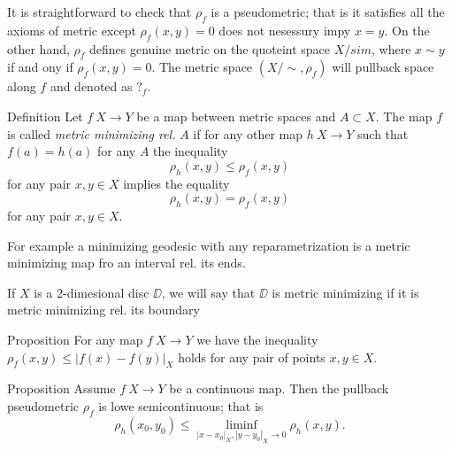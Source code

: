 It is straightforward to check that $\rho_f$ is a pseudometric;
that is it satisfies all the axioms of metric except $\rho_f(x,y)=0$ does not nesessury impy $x=y$.
On the other hand, $\rho_f$
defines genuine metric on the quoteint space $X/sim$,
where $x\sim y$ if and ony if $\rho_f(x,y)=0$.
The metric space $(X/\sim,\rho_f)$ will pullback space along $f$
and denoted as $?_f$.

\begin{thm}{Definition}
Let $f\:X\to Y$ be a map between metric spaces
and $A\subset X$.
The map $f$ is called \emph{metric minimizing rel.} $A$
if for any other map $h\: X\to Y$ 
such that $f(a)=h(a)$ for any $A$
the inequality
\[\rho_{h}(x,y)\le \rho_f(x,y)\]
for any pair $x,y\in X$
implies the equality
\[\rho_{h}(x,y)= \rho_f(x,y)\]
for any pair $x,y\in X$.
\end{thm}

For example a minimizing geodesic with any reparametrization is a metric minimizing map fro an interval rel. its ends.

If $X$ is a 2-dimesional disc $\DD$,
we will say that $\DD$ is metric minimizing if it is metric minimizing rel. its boundary

\begin{thm}{Proposition}
For any map $f\:X\to Y$ we have the inequality 
$\rho_f(x,y)\le |f(x)-f(y)|_X$
holds for any pair of points $x,y\in X$.
\end{thm}


\begin{thm}{Proposition}
Assume $f\:X\to Y$ be a continuous map.
Then the pullback pseudometric $\rho_f$ is lowe semicontinuous;
that is
\[\rho_h(x_0,y_0)
\le
\liminf_{|x-x_0|_X,|y-y_0|_X\to 0}
\rho_h(x,y).\]
\end{thm}